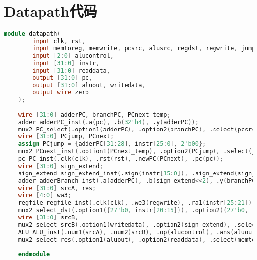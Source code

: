 \appendix
\section{Datapath代码}
\begin{lstlisting}[language=Verilog]
    module datapath(
        input clk, rst,
        input memtoreg, memwrite, pcsrc, alusrc, regdst, regwrite, jump,
        input [2:0] alucontrol,
        input [31:0] instr,
        input [31:0] readdata,
        output [31:0] pc,
        output [31:0] aluout, writedata,
        output wire zero
    );
    
    wire [31:0] adderPC, branchPC, PCnext_temp;
    adder adderPC_inst(.a(pc), .b(32'h4), .y(adderPC));
    mux2 PC_select(.option1(adderPC), .option2(branchPC), .select(pcsrc), .data(PCnext_temp));
    wire [31:0] PCjump, PCnext;
    assign PCjump = {adderPC[31:28], instr[25:0], 2'b00};
    mux2 PCnext_inst(.option1(PCnext_temp), .option2(PCjump), .select(jump), .data(PCnext));
    pc PC_inst(.clk(clk), .rst(rst), .newPC(PCnext), .pc(pc));
    wire [31:0] sign_extend;
    sign_extend sign_extend_inst(.sign(instr[15:0]), .sign_extend(sign_extend));
    adder adderBranch_inst(.a(adderPC), .b(sign_extend<<2), .y(branchPC));
    wire [31:0] srcA, res;
    wire [4:0] wa3;
    regfile regfile_inst(.clk(clk), .we3(regwrite), .ra1(instr[25:21]), .ra2(instr[20:16]), .wa3(wa3), .wd3(res), .rd1(srcA), .rd2(writedata));
    mux2 select_dst(.option1({27'b0, instr[20:16]}), .option2({27'b0, instr[15:11]}), .select(regdst), .data(wa3));
    wire [31:0] srcB;
    mux2 select_srcB(.option1(writedata), .option2(sign_extend), .select(alusrc), .data(srcB));
    ALU ALU_inst(.num1(srcA), .num2(srcB), .op(alucontrol), .ans(aluout), .zero(zero));
    mux2 select_res(.option1(aluout), .option2(readdata), .select(memtoreg), .data(res));
    
    endmodule
\end{lstlisting}
